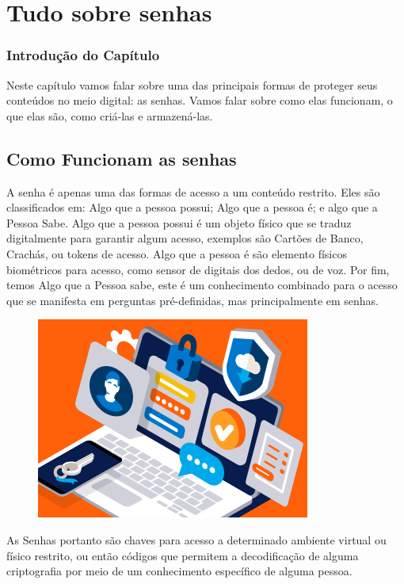 \part{Tudo sobre senhas}

\section{Introdução do Capítulo}

Neste capítulo vamos falar sobre uma das principais formas de proteger seus conteúdos no meio digital: as senhas. Vamos falar sobre como elas funcionam, o que elas são, como criá-las e armazená-las.

\chapter{Como Funcionam as senhas}

A senha é apenas uma das formas de acesso a um conteúdo restrito. Eles são classificados em: Algo que a pessoa possui; Algo que a pessoa é; e algo que a Pessoa Sabe. Algo que a pessoa possui é um objeto físico que se traduz digitalmente para garantir algum acesso, exemplos são Cartões de Banco, Crachás, ou tokens de acesso. Algo que a pessoa é são elemento físicos biométricos para acesso, como sensor de digitais dos dedos, ou de voz. Por fim, temos Algo que a Pessoa sabe, este é um conhecimento combinado para o acesso que se manifesta em perguntas pré-definidas, mas principalmente em senhas.
\begin{figure}[h]
\centering
\includegraphics{img/formas_de_acesso.png}
\end{figure}

As Senhas portanto são chaves para acesso a determinado ambiente virtual ou físico restrito, ou então códigos que permitem a decodificação de alguma criptografia por meio de um conhecimento específico de alguma pessoa.

